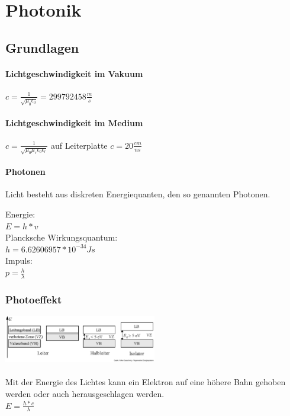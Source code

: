\section {Photonik}
\subsection {Grundlagen}
\begin{multicols}{2}
\paragraph {Lichtgeschwindigkeit im Vakuum}
$c = \frac {1}{\sqrt{\mu_0 \epsilon_0}} = 299792458 \frac{m}{s}$

\paragraph {Lichtgeschwindigkeit im Medium}
$c = \frac {1}{\sqrt{\mu_0 \mu_r \epsilon_0 \epsilon_r}}$ auf Leiterplatte $c = 20 \frac{cm}{ns}$ 
\end{multicols}

\paragraph {Photonen}
Licht besteht aus diskreten Energiequanten, den so genannten Photonen.
\begin{multicols}{3}
Energie: \\ $E = h * v$ \\
Plancksche Wirkungsquantum: \\ $h = 6.62606957 * 10^{-34} Js$ \\
Impuls: \\ $p = \frac {h}{\lambda}$ 
\end{multicols}

\subsubsection {Photoeffekt}
\begin{multicols}{4}
\includegraphics[width=0.5\textwidth]{images/Leitungsband} \\ \columnbreak 
\ \\ \vfill \columnbreak 
Mit der Energie des Lichtes kann ein Elektron auf eine höhere Bahn gehoben werden oder auch herausgeschlagen werden. \\ 
$E = \frac{h * c}{\lambda}$
\end{multicols}

